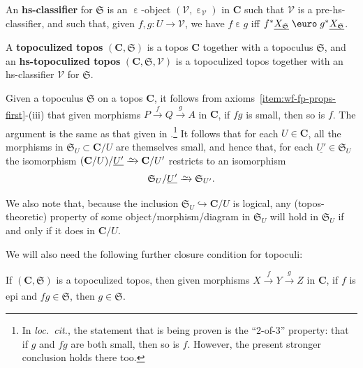 \documentclass{amsart}
\newcommand\bC{\mathbf{C}}
\newcommand\cV{\mathcal{V}}
\newcommand\defword[1]{{\boldmath \textbf{#1}}}
\newcommand\Ein{\mathrel{\text{\textup{\euro}}}}
\newcommand\ein{\mathrel{\varepsilon}}
\newcommand\fS{\mathfrak{S}}
\newcommand\hto{\hookrightarrow}
\newcommand\loccit{\textit{loc.~cit.}}
\newcommand\toi{\xrightarrow{\raisebox{-2.5pt}[0pt][0pt]{\ensuremath{\scriptstyle{\sim}}}}}
\newcommand\tox[2][]{\xrightarrow[#1]{#2}}
\newcommand\und[1]{\underline{#1}}
\newcommand\unein{{\ein}}
\theoremstyle{definition}
\theoremstyle{remark}
\theoremstyle{plainwithref}
\begin{document}
\begin{defn}
  An \defword{hs-classifier} for \( \fS \) is an \( \unein \)-object \( (\cV, \ein_{\cV}) \) in \( \bC \) such that \( \cV \) is a pre-hs-classifier, and such that, given \( f,g \colon U \to \cV \), we have \( f \ein g \) iff \( f^* \und{X_\fS} \Ein g^* \und{X_\fS} \).

  A \defword{topoculized topos} \( (\bC, \fS) \) is a topos \( \bC \) together with a topoculus \( \fS \), and an \defword{hs-topoculized topos} \( (\bC, \fS, \cV) \) is a topoculized topos together with an hs-classifier \( \cV \) for \( \fS \).
\end{defn}

\begin{rmk} \label{rmk:topoculus-2-of-3}
  Given a topoculus \( \fS \) on a topos \( \bC \), it follows from axioms~\ref{item:wf-fp-props-first}-(iii) that given morphisms \( P \tox{f} Q \tox{g} A \) in \( \bC \), if \( f g \) is small, then so is \( f \).
  The argument is the same as that given in \cite[Proposition~2.3.4]{helfer-topoi-in-topoi}.\footnote{%
    \label{footnote:1-of-2-of-3}
    In \loccit, the statement that is being proven is the ``2-of-3'' property: that if \( g \) and \( f g \) are both small, then so is \( f \).
    However, the present stronger conclusion holds there too.
  }
  It follows that for each \( U \in \bC \), all the morphisms in \( \fS_U \subset \bC / U \) are themselves small, and hence that, for each \( \und{U'} \in \fS_U \) the isomorphism \( (\bC / U) / \und{U'} \toi \bC / U' \) restricts to an isomorphism
  \[
    \fS_U / \und{U'} \toi \fS_{U'}.
  \]

  We also note that, because the inclusion \( \fS_U \hto \bC / U \) is logical, any (topos-theoretic) property of some object/morphism/diagram in \( \fS_U \) will hold in \( \fS_U \) if and only if it does in \( \bC / U \).
\end{rmk}

We will also need the following further closure condition for topoculi:
\begin{propn} \label{propn:topoculus-epi-closed}
  If \( (\bC, \fS) \) is a topoculized topos, then given morphisms \( X \tox{f} Y \tox{g} Z \) in \( \bC \), if \( f \) is epi and \( f g \in \fS \), then \( g \in \fS \).
\end{propn}
\end{document}
